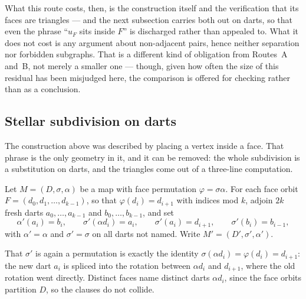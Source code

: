 \begin{remark}
What this route costs, then, is the construction itself and the verification
that its faces are triangles --- and the next subsection carries both out on
darts, so that even the phrase ``$u_F$ sits inside $F$'' is discharged rather
than appealed to. What it does not cost is any argument about
non-adjacent pairs, hence neither separation nor forbidden subgraphs. That is
a different kind of obligation from Routes~A and~B, not merely a smaller
one --- though, given how often the size of this residual has been misjudged
here, the comparison is offered for checking rather than as a conclusion.
\end{remark}

\subsection{Stellar subdivision on darts}

The construction above was described by placing a vertex inside a face. That
phrase is the only geometry in it, and it can be removed: the whole
subdivision is a substitution on darts, and the triangles come out of a
three-line computation.

\begin{definition}\label{def:stellar}
\Sprose
Let $M = (D,\sigma,\alpha)$ be a map with face permutation
$\varphi = \sigma\alpha$. For each face orbit
$F = (d_0, d_1, \dots, d_{k-1})$, so that $\varphi(d_i) = d_{i+1}$ with
indices mod $k$, adjoin $2k$ fresh darts $a_0,\dots,a_{k-1}$ and
$b_0,\dots,b_{k-1}$, and set
\[
  \alpha'(a_i) = b_i, \qquad
  \sigma'(\alpha d_i) = a_i, \qquad
  \sigma'(a_i) = d_{i+1}, \qquad
  \sigma'(b_i) = b_{i-1},
\]
with $\alpha' = \alpha$ and $\sigma' = \sigma$ on all darts not named. Write
$M' = (D', \sigma', \alpha')$.
\end{definition}

That $\sigma'$ is again a permutation is exactly the identity
$\sigma(\alpha d_i) = \varphi(d_i) = d_{i+1}$: the new dart $a_i$ is spliced
into the rotation between $\alpha d_i$ and $d_{i+1}$, where the old rotation
went directly. Distinct faces name distinct darts $\alpha d_i$, since the
face orbits partition $D$, so the clauses do not collide.

